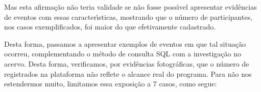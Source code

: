 \documentclass[
12pt,		%
openright,	%
twoside,  %
a4paper,			%
chapter=TITLE,		%
english,			%
french,				%
spanish,			%
brazil				%
]{USPSC-classe/USPSC}
\begin{document}
Mas esta afirma\c{c}\~ao n\~ao teria validade se n\~ao fosse poss\'{\i}vel apresentar evid\^encias de eventos com essas caracter\'{\i}sticas, mostrando que o n\'umero de participantes, nos casos exemplificados, foi maior do que efetivamente cadastrado.

















Desta forma, passamos a apresentar exemplos de eventos em que tal situa\c{c}\~ao ocorreu, complementando o m\'etodo de consulta SQL com a investiga\c{c}\~ao no acervo. Desta forma, verificamos, por evid\^encias fotogr\'aficas, que o n\'umero de registrados na plataforma n\~ao reflete o alcance real do programa. Para n\~ao nos estendermos muito, limitamos essa exposi\c{c}\~ao a 7 casos, como segue:
\end{document}
